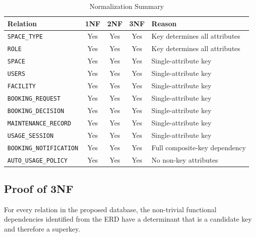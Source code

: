 \begin{table}[H]
\centering
\small
\caption{Normalization Summary}
\label{tab:normalization-summary}
\begin{tabular}{|l|c|c|c|l|}
\hline
\textbf{Relation} & \textbf{1NF} & \textbf{2NF} & \textbf{3NF}
& \textbf{Reason} \\ \hline

\texttt{SPACE\_TYPE}
& Yes & Yes & Yes
& Key determines all attributes \\ \hline

\texttt{ROLE}
& Yes & Yes & Yes
& Key determines all attributes \\ \hline

\texttt{SPACE}
& Yes & Yes & Yes
& Single-attribute key \\ \hline

\texttt{USERS}
& Yes & Yes & Yes
& Single-attribute key \\ \hline

\texttt{FACILITY}
& Yes & Yes & Yes
& Single-attribute key \\ \hline

\texttt{BOOKING\_REQUEST}
& Yes & Yes & Yes
& Single-attribute key \\ \hline

\texttt{BOOKING\_DECISION}
& Yes & Yes & Yes
& Single-attribute key \\ \hline

\texttt{MAINTENANCE\_RECORD}
& Yes & Yes & Yes
& Single-attribute key \\ \hline

\texttt{USAGE\_SESSION}
& Yes & Yes & Yes
& Single-attribute key \\ \hline

\texttt{BOOKING\_NOTIFICATION}
& Yes & Yes & Yes
& Full composite-key dependency \\ \hline

\texttt{AUTO\_USAGE\_POLICY}
& Yes & Yes & Yes
& No non-key attributes \\ \hline

\end{tabular}
\end{table}

\subsection{Proof of 3NF}

For every relation in the proposed database, the non-trivial
functional dependencies identified from the ERD have a determinant
that is a candidate key and therefore a superkey.

